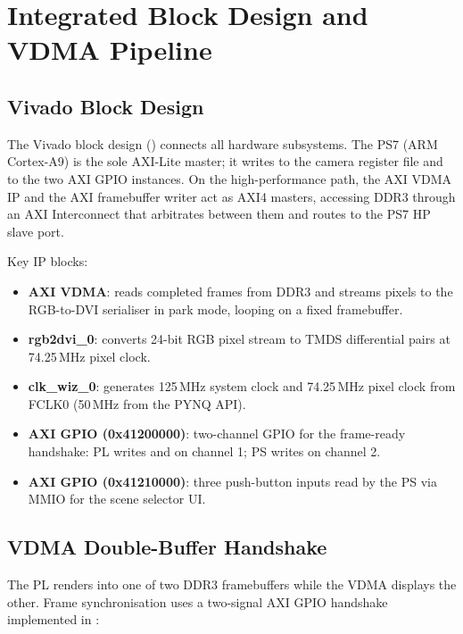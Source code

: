 \section{Integrated Block Design and VDMA Pipeline}
\label{sec:vdma}

\subsection{Vivado Block Design}

The Vivado block design () connects all hardware subsystems.
The PS7 (ARM Cortex-A9) is the sole AXI-Lite master; it writes to the camera
register file and to the two AXI GPIO instances. On the high-performance path,
the AXI VDMA IP and the AXI framebuffer writer act as AXI4 masters, accessing
DDR3 through an AXI Interconnect that arbitrates between them and routes to the
PS7 HP slave port.

Key IP blocks:
\begin{itemize}
    \item \textbf{AXI VDMA}: reads completed frames from DDR3 and streams
    pixels to the RGB-to-DVI serialiser in park mode, looping on a fixed
    framebuffer.
    \item \textbf{rgb2dvi\_0}: converts 24-bit RGB pixel stream to TMDS
    differential pairs at 74.25\,MHz pixel clock.
    \item \textbf{clk\_wiz\_0}: generates 125\,MHz system clock and
    74.25\,MHz pixel clock from FCLK0 (50\,MHz from the PYNQ API).
    \item \textbf{AXI GPIO (0x41200000)}: two-channel GPIO for the
    frame-ready handshake: PL writes  and
     on channel 1; PS writes  on
    channel 2.
    \item \textbf{AXI GPIO (0x41210000)}: three push-button inputs read
    by the PS via MMIO for the scene selector UI.
\end{itemize}

\subsection{VDMA Double-Buffer Handshake}

The PL renders into one of two DDR3 framebuffers while the VDMA displays the
other. Frame synchronisation uses a two-signal AXI GPIO handshake implemented
in :

